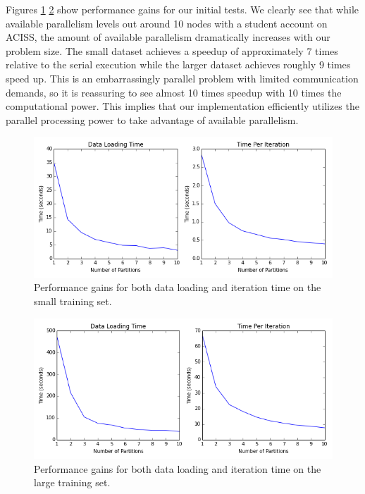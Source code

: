 Figures \ref{fig:small} \ref{fig:big} show performance gains for our initial tests.  We clearly see that while available parallelism levels out around 10 nodes with a student account on ACISS, the amount of available parallelism dramatically increases with our problem size.  The small dataset achieves a speedup of approximately 7 times relative to the serial execution while the larger dataset achieves roughly 9 times speed up.  This is an embarrassingly parallel problem with limited communication demands, so it is reassuring to see almost 10 times speedup with 10 times the computational power.  This implies that our implementation efficiently utilizes the parallel processing power to take advantage of available parallelism.

\begin{figure}[h]
\begin{center}
\includegraphics[scale=0.7]{small_metrics.png}
\caption{Performance gains for both data loading and iteration time on the small training set.}
\label{fig:small}
\end{center}
\end{figure}

\begin{figure}[h]
\begin{center}
\includegraphics[scale=0.7]{big_metrics.png}
\caption{Performance gains for both data loading and iteration time on the large training set.}
\label{fig:big}
\end{center}
\end{figure}

